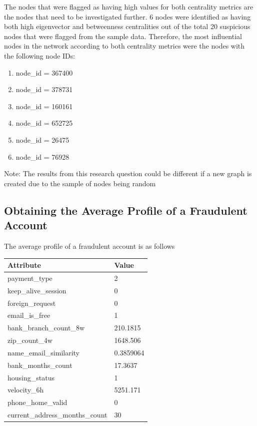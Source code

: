 \documentclass{styles/svproc}
\begin{document}

\bigskip
\noindent The nodes that were flagged as having high values for both centrality metrics are the nodes that need to be investigated further. 6 nodes were identified as having both high eigenvector and betweenness centralities out of the total 20 suspicious nodes that were flagged from the sample data. Therefore, the most influential nodes in the network according to both centrality metrics were the nodes with the following node IDs:

\begin{enumerate}
  \item node\_id = 367400
  \item node\_id = 378731
  \item node\_id = 160161
  \item node\_id = 652725
  \item node\_id = 26475
  \item node\_id = 76928
\end{enumerate}

\noindent Note: The results from this research question could be different if a new graph is created due to the sample of nodes being random

\subsection{Obtaining the Average Profile of a Fraudulent Account}

\normalfont
The average profile of a fraudulent account is as follows

\bigskip
\begin{tabular}{ | m{7cm} | m{3cm}|} 
  \hline
  \textbf{Attribute} & \textbf{Value} \\ 
  \hline
  payment\_type & 2 \\ 
  \hline
  keep\_alive\_session & 0 \\ 
  \hline
  foreign\_request & 0 \\
  \hline
  email\_is\_free & 1 \\
  \hline
  bank\_branch\_count\_8w & 210.1815 \\
  \hline
  zip\_count\_4w & 1648.506 \\
  \hline
  name\_email\_similarity & 0.3859064 \\
  \hline
  bank\_months\_count & 17.3637 \\
  \hline
  housing\_status & 1 \\
  \hline
  velocity\_6h & 5251.171 \\
  \hline
  phone\_home\_valid & 0 \\
  \hline
  current\_address\_months\_count & 30 \\
  \hline
\end{tabular}
\end{document}
